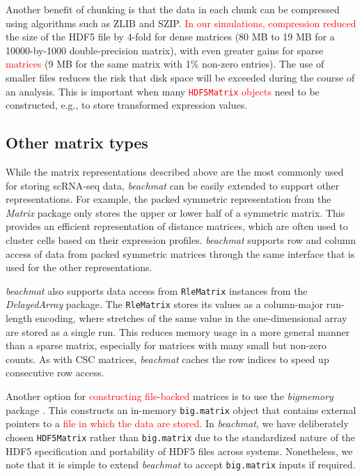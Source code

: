 \documentclass{article}
\newcommand{\beachmat}{\textit{beachmat}}
\newcommand{\code}[1]{\texttt{#1}}
\newcommand{\revised}[1]{\textcolor{red}{#1}}
\begin{document}
Another benefit of chunking is that the data in each chunk can be compressed using algorithms such as ZLIB and SZIP.
\revised{In our simulations, compression reduced} the size of the HDF5 file by 4-fold for dense matrices (80 MB to 19 MB for a 10000-by-1000 double-precision matrix), with even greater gains for sparse \revised{matrices} (9 MB for the same matrix with 1\% non-zero entries).
The use of smaller files reduces the risk that disk space will be exceeded during the course of an analysis.
This is important when many \revised{\code{HDF5Matrix} objects} need to be constructed, e.g., to store transformed expression values.

\subsection{Other matrix types}
While the matrix representations described above are the most commonly used for storing scRNA-seq data, \beachmat{} can be easily extended to support other representations.
For example, the packed symmetric representation from the \textit{Matrix} package only stores the upper or lower half of a symmetric matrix.
This provides an efficient representation of distance matrices, which are often used to cluster cells based on their expression profiles.
\beachmat{} supports row and column access of data from packed symmetric matrices through the same interface that is used for the other representations.

\beachmat{} also supports data access from \code{RleMatrix} instances from the \textit{DelayedArray} package.
The \code{RleMatrix} stores its values as a column-major run-length encoding, where stretches of the same value in the one-dimensional array are stored as a single run.
This reduces memory usage in a more general manner than a sparse matrix, especially for matrices with many small but non-zero counts.
As with CSC matrices, \beachmat{} caches the row indices to speed up consecutive row access.

Another option for \revised{constructing file-backed} matrices is to use the \textit{bigmemory} package \cite{kane2013scalable}.
This constructs an in-memory \code{big.matrix} object that contains external pointers to a \revised{file in which the data are stored.}
In \beachmat{}, we have deliberately chosen \code{HDF5Matrix} rather than \code{big.matrix} due to the standardized nature of the HDF5 specification and portability of HDF5 files across systems.
Nonetheless, we note that it is simple to extend \beachmat{} to accept \code{big.matrix} inputs if required.
\end{document}
